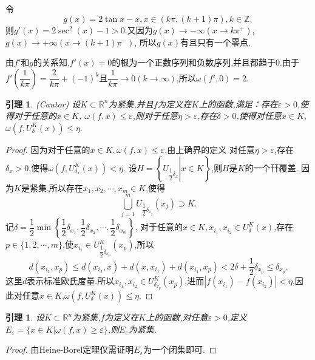 \documentclass[a4paper,12pt]{article}
\newtheorem{lemma}[theorem]{引理}
\begin{document}
{                令$$g(x)=2\tan x-x,x\in(k\pi,(k+1)\pi),k\in\mathbb{Z},$$则$g'(x)=2\sec^2(x)-1>0$.又因为$g(x)\to -\infty(x\to k\pi^{+})$,$g(x)\to +\infty(x\to (k+1)\pi^{-})$,
                所以$g(x)$有且只有一个零点.

                由$f'$和$g$的关系知,$f'(x)=0$的根为一个正数序列和负数序列,并且都趋于0.由于$f'\left(\dfrac{1}{k\pi}\right)=\dfrac{2}{k\pi}+(-1)^k$且$\dfrac{1}{k\pi}\to 0(k\to\infty)$,所以$\omega(f',0)=2$.
                \begin{lemma}{\emph{(Cantor)}}
                    设$K\subset\mathbb{R}^n$为紧集,并且$f$为定义在$K$上的函数,满足：存在$\varepsilon>0$,使得对于任意的$x\in K$,
                    $\omega(f,x)\leqslant\varepsilon$,则对于任意$\eta>\varepsilon$,存在$\delta>0$,使得对任意$x\in K$,$\omega(f,U_\delta^K(x))\leqslant\eta.$
                \end{lemma}
                \begin{proof}
                    因为对于任意的$x\in K,\omega(f,x)\leqslant\varepsilon$,由上确界的定义
                    对任意$\eta>\varepsilon$,存在$\delta_x>0$,使得$\omega(f,U_{\delta_x}^K(x))<\eta$.
                    设$H=\left\{\left.U_{\dfrac{1}{2}\delta_x}\right|x\in K\right\}$,则$H$是$K$的一个幵覆盖.
                    因为$K$是紧集,所以存在$x_1,x_2,\cdots,x_m\in K$,使得
                    $$\bigcup_{j=1}^mU_{\dfrac{1}{2}\delta_{x_j}}(x_j)\supset K.$$
                    记$\delta=\dfrac{1}{2}\min\left\{\dfrac{1}{2}\delta_{x_1},\dfrac{1}{2}\delta_{x_2},\cdots,\dfrac{1}{2}\delta_{x_m}\right\}$,
                    对于任意的$x\in K,x_{i_1},x_{i_2}\in U_{\delta}^K(x)$,存在$p\in\{1,2,\cdots,m\}$,使$x_{i_1}\in U_{\dfrac{1}{2}\delta_{x_p}}^K(x_p)$,所以
                    $$d(x_{i_2},x_p)\leqslant d(x_{i_2},x)+d(x,x_{i_1})+d(x_{i_1},x_p)<2\delta+\dfrac{1}{2}\delta_{x_p}\leqslant\delta_{x_p}.$$
                    这里$d$表示标准欧氏度量.所以$x_{i_1},x_{i_2}\in U_{\delta_{x_p}}^K(x_p)$,进而$|f(x_{i_1})-f(x_{i_2})|<\eta$,因此对任意$x\in K$,$\omega(f,U_\delta^K(x))\leqslant\eta.$
                \end{proof}

                \begin{lemma}
                    设$K\subset\mathbb{R}^n$为紧集,$f$为定义在$K$上的函数,对任意$\varepsilon>0$,定义$E_\varepsilon=\{x\in K|\omega(f,x)\geqslant\varepsilon\}$,则$E_\varepsilon$为紧集.
                \end{lemma}

                \begin{proof}
                    由Heine-Borel定理仅需证明$E_\varepsilon$为一个闭集即可.


\end{proof}}
\end{document}
